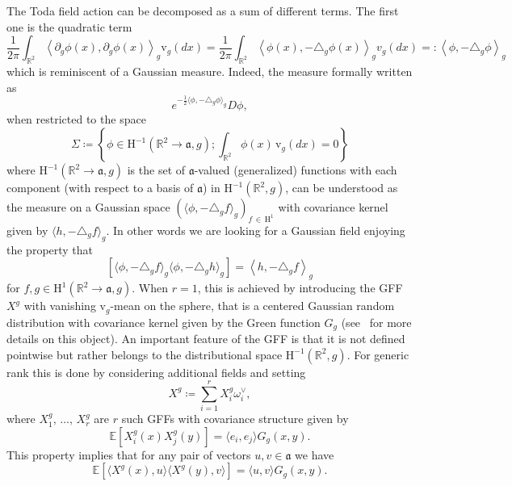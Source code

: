 \documentclass[10pt]{amsart}
\theoremstyle{definition}\newtheorem{defi}[theo]{Definition}\newtheorem{rema}[theo]{Remark}\newtheorem{exam}[theo]{Example}\newtheorem{exem}[theo]{Example}\newtheorem{nota}[theo]{Notation}
\newcommand{\frka}{\mathfrak{a}}
\newcommand{\rmv}{\mathrm{v}}
\newcommand{\rmH}{\mathrm{H}}
\newcommand{\R}{\mathbb{R}}
\newcommand{\E}{\mathbb{E}}
\newcommand{\ps}[1]{\langle #1 \rangle}
\newcommand*\green[1]{#1}
\begin{document}
The Toda field action can be decomposed as a sum of different terms. The first one is the quadratic term
\[
\frac{1}{2\pi}\int_{\R^2}\left\langle\partial_g\phi(x),\partial_g\phi(x)\right\rangle_g\rmv_g(dx)=\frac{1}{2\pi}\int_{\R^2}\left\langle\phi(x),-\triangle_g\phi(x)\right\rangle_gv_g(dx)=:\left\langle\phi,-\triangle_g\phi\right\rangle_g
\]
which is reminiscent of a Gaussian measure. Indeed, the measure formally written as
\begin{equation}\label{GPI}
e^{-\frac{1}{2}\ps{\phi,-\triangle_g\phi}_g}D\phi,
\end{equation}
when restricted to the space
\[
\Sigma\coloneqq \left\{\phi\in \rmH^{-1}\left(\R^2\to\frka,g\right); \int_{\R^2} \green\phi(x)\, \rmv_g(dx)=0\right\}
\]
where $ \rmH^{-1}(\R^2\to\frka,g)$ is the set of $\frka$-valued (generalized) functions with each component (with respect to a basis of $\frka$) in $\rmH^{-1}(\R^2,g)$, can be understood as the measure on a Gaussian space $\left(\ps{\phi,-\triangle_g f}_g\right)_{f\,\in\,\rmH^{1}}$ with covariance kernel given by $\ps{h,-\triangle_g f}_g$. In other words we are looking for a Gaussian field enjoying the property that
\begin{equation}\label{eq:GFF_cov1}
\left[\ps{\phi,-\triangle_g f}_g\ps{\phi,-\triangle_g h}_g\right]=\left\langle h,-\triangle_g f\right\rangle_g
\end{equation}
for $f,g\in \rmH^{1}(\R^2\to\frka,g)$. When $r=1$, this is achieved by introducing the GFF $X^g$ with vanishing $\rmv_g$-mean on the sphere, that is a centered Gaussian random distribution with covariance kernel given by the Green function $G_g$ (see~\cite{dubedat,She07} for more details on this object). An important feature of the GFF is that it is not defined pointwise but rather belongs to the distributional space $\rmH^{-1}(\R^2,g)$. For generic rank this is done by considering additional fields and setting
\begin{equation}
X^g\coloneqq \sum_{i=1}^{r}X^g_i\omega_i^\vee,
\end{equation}
where $X^g_1,\,\dots,\,X^g_{r}$ are $r$ such GFFs with covariance structure given by
\begin{equation}\label{GFF_covariance}
\E\left[X^g_i(x) X^g_j(y)\right]=\ps{e_i,e_j} G_g(x,y).
\end{equation}
This property implies that for any pair of vectors $u,v\in\frka$ we have
\begin{equation}\label{GFF_covariance2}
\E\left[\ps{X^g(x),u}\ps{X^g(y),v}\right]=\ps{u,v} G_g(x,y).
\end{equation}
\end{document}
